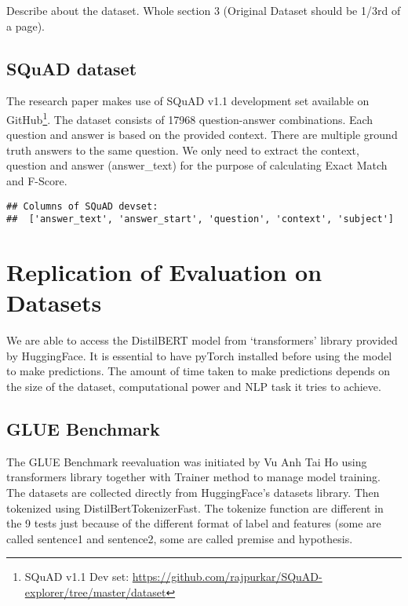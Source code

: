 \documentclass[
  11pt,
]{article}
\begin{document}
Describe about the dataset. Whole section 3 (Original Dataset should be
1/3rd of a page).

\hypertarget{squad-dataset}{%
\subsection{SQuAD dataset}\label{squad-dataset}}

The research paper makes use of SQuAD v1.1 development set available on
GitHub\footnote{SQuAD v1.1 Dev set:
  \url{https://github.com/rajpurkar/SQuAD-explorer/tree/master/dataset}}.
The dataset consists of 17968 question-answer combinations. Each
question and answer is based on the provided context. There are multiple
ground truth answers to the same question. We only need to extract the
context, question and answer (answer\_text) for the purpose of
calculating Exact Match and F-Score.

\begin{verbatim}
## Columns of SQuAD devset:
##  ['answer_text', 'answer_start', 'question', 'context', 'subject']
\end{verbatim}

\hypertarget{replication-of-evaluation-on-datasets}{%
\section{Replication of Evaluation on
Datasets}\label{replication-of-evaluation-on-datasets}}

We are able to access the DistilBERT model from `transformers' library
provided by HuggingFace. It is essential to have pyTorch installed
before using the model to make predictions. The amount of time taken to
make predictions depends on the size of the dataset, computational power
and NLP task it tries to achieve.

\hypertarget{glue-benchmark-1}{%
\subsection{GLUE Benchmark}\label{glue-benchmark-1}}

The GLUE Benchmark reevaluation was initiated by Vu Anh Tai Ho using
transformers library together with Trainer method to manage model
training. The datasets are collected directly from HuggingFace's
datasets library. Then tokenized using DistilBertTokenizerFast. The
tokenize function are different in the 9 tests just because of the
different format of label and features (some are called sentence1 and
sentence2, some are called premise and hypothesis.
\end{document}
